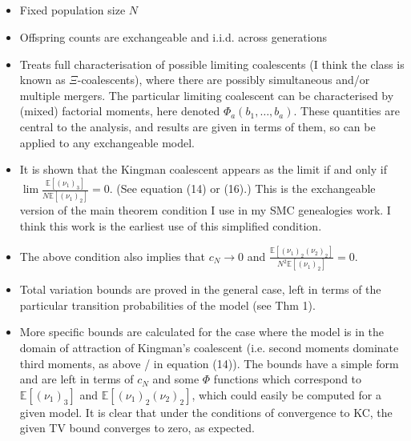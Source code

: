 \documentclass{article}
\newcommand{\E}{\mathbb{E}}
\begin{document}
\subsection*{\cite{mohle2000}}
\begin{itemize}
\item Fixed population size $N$
\item Offspring counts are exchangeable and i.i.d. across generations
\item Treats full characterisation of possible limiting coalescents (I think the class is known as $\Xi$-coalescents), where there are possibly simultaneous and/or multiple mergers. The particular limiting coalescent can be characterised by (mixed) factorial moments, here denoted $\Phi_a(b_1,\dots,b_a)$. These quantities are central to the analysis, and results are given in terms of them, so can be applied to any exchangeable model.
\item It is shown that the Kingman coalescent appears as the limit if and only if $ \lim \frac{\E[(\nu_1)_3]}{N\E[(\nu_1)_2]} =0$. (See equation (14) or (16).) This is the exchangeable version of the main theorem condition I use in my SMC genealogies work. I think this work is the earliest use of this simplified condition.
\item The above condition also implies that $c_N \to 0$ and $\frac{\E[(\nu_1)_2 (\nu_2)_2]}{N^2 \E[(\nu_1)_2]} =0$.
\item Total variation bounds are proved in the general case, left in terms of the particular transition probabilities of the model (see Thm 1).
\item More specific bounds are calculated for the case where the model is in the domain of attraction of Kingman's coalescent (i.e. second moments dominate third moments, as above / in equation (14)). The bounds have a simple form and are left in terms of $c_N$ and some $\Phi$ functions which correspond to $\E[(\nu_1)_3]$ and $\E[(\nu_1)_2(\nu_2)_2]$, which could easily be computed for a given model. It is clear that under the conditions of convergence to KC, the given TV bound converges to zero, as expected.
\end{itemize}
\end{document}
